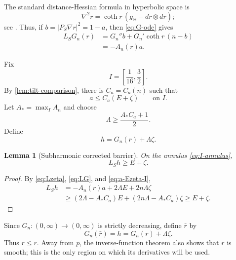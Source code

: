 \documentclass[11pt,reqno]{amsart}
\numberwithin{equation}{section}
\newtheorem{lemma}[lemma]{Lemma}
\theoremstyle{definition}
\theoremstyle{remark}
\newcommand{\Hyp}{\mathbb H}
\begin{document}
The standard distance-Hessian formula in hyperbolic space is
\[
 \nabla^2r=\coth r\,(g_{\Hyp}-dr\otimes dr);
\]
see \cite[Section~5.5]{Petersen}.  Thus, if
$b=|P_S\nabla r|^2=1-a$, then \eqref{eq:G-ode} gives
\begin{equation}\label{eq:LG}
 \begin{split}
 L_SG_n(r)
 &=G_n''b+G_n'\coth r\,(n-b)\\
 &=-A_n(r)a.
 \end{split}
\end{equation}

Fix
\begin{equation}\label{eq:I-annulus}
 I=\left[\frac1{16},\frac32\right].
\end{equation}
By \cref{lem:tilt-comparison}, there is $C_a=C_a(n)$ such that
\begin{equation}\label{eq:a-Ezeta-I}
 a\le C_a(E+\zeta)
 \qquad\text{on }I.
\end{equation}
Let $A_*=\max_I A_n$ and choose
\begin{equation}\label{eq:Lambda-choice}
 \Lambda\ge\frac{A_*C_a+1}{2}.
\end{equation}
Define
\begin{equation}\label{eq:h-def}
 h=G_n(r)+\Lambda\zeta.
\end{equation}

\begin{lemma}[Subharmonic corrected barrier]\label{lem:subharmonic-h}
On the annulus \eqref{eq:I-annulus},
\begin{equation}\label{eq:Lh}
 L_Sh\ge E+\zeta.
\end{equation}
\end{lemma}

\begin{proof}
By \eqref{eq:Lzeta}, \eqref{eq:LG}, and \eqref{eq:a-Ezeta-I},
\begin{align*}
 L_Sh
 &=-A_n(r)a+2\Lambda E+2n\Lambda\zeta\\
 &\ge(2\Lambda-A_*C_a)E+(2n\Lambda-A_*C_a)\zeta
 \ge E+\zeta.
\end{align*}
\end{proof}

Since $G_n:(0,\infty)\to(0,\infty)$ is strictly decreasing, define $\bar r$ by
\begin{equation}\label{eq:rbar-def}
 G_n(\bar r)=h=G_n(r)+\Lambda\zeta.
\end{equation}
Thus $\bar r\le r$.  Away from $p$, the inverse-function theorem also
shows that $\bar r$ is smooth; this is the only region on which its
derivatives will be used.
\end{document}
